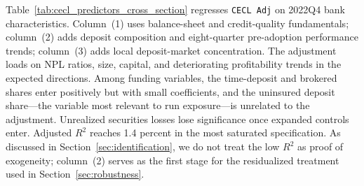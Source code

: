 Table~\ref{tab:cecl_predictors_cross_section} regresses \texttt{CECL Adj}
on 2022Q4 bank characteristics.  Column~(1) uses balance-sheet and
credit-quality fundamentals; column~(2) adds deposit composition and
eight-quarter pre-adoption performance trends; column~(3) adds local
deposit-market concentration.  The adjustment loads on NPL ratios, size,
capital, and deteriorating profitability trends in the expected
directions.  Among funding variables, the time-deposit and brokered
shares enter positively but with small coefficients, and the uninsured
deposit share---the variable most relevant to run exposure---is
unrelated to the adjustment.  Unrealized securities losses lose
significance once expanded controls enter.  Adjusted $R^2$ reaches 1.4
percent in the most saturated specification.  As discussed in
Section~\ref{sec:identification}, we do not treat the low $R^2$ as proof
of exogeneity; column~(2) serves as the first stage for the residualized
treatment used in Section~\ref{sec:robustness}.
